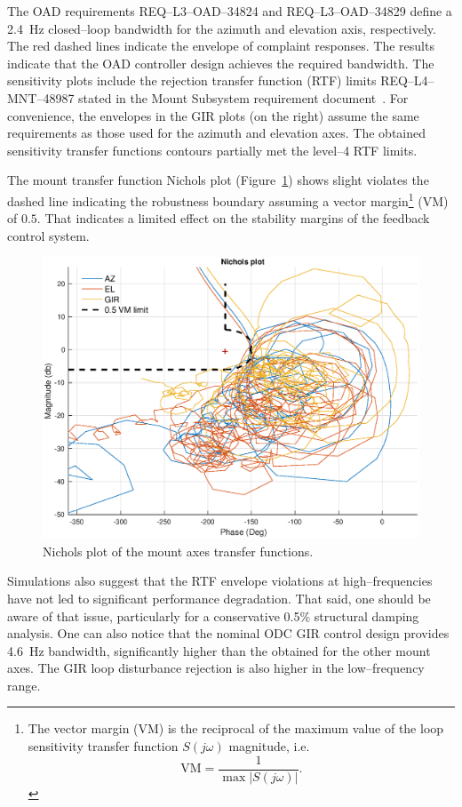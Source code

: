 %
The OAD requirements REQ--L3--OAD--34824 and REQ--L3--OAD--34829 define a \SI{2.4}{Hz} closed--loop bandwidth for the azimuth and elevation axis, respectively. The red dashed lines indicate the envelope of complaint responses. The results indicate that the OAD controller design achieves the required bandwidth. The sensitivity plots include the rejection transfer function (RTF) limits REQ--L4--MNT--48987 stated in the Mount Subsystem requirement document~\cite{MOUNT-RD}. For convenience, the envelopes in the GIR plots (on the right) assume the same requirements as those used for the azimuth and elevation axes. The obtained sensitivity transfer functions contours partially met the level--4 RTF limits. 

The mount transfer function Nichols plot (Figure~\ref{fig:mnt-nichols-plot}) shows slight violates the dashed line indicating the robustness boundary assuming a vector margin\footnote{The vector margin (VM) is the reciprocal of the maximum value of the loop sensitivity transfer function $S\left(j\omega\right)$ magnitude, i.e.$$\text{VM}=\frac{1}{\max \left|S(j\omega)\right|}.$$} (VM) of $0.5$. That indicates a limited effect on the stability margins of the feedback control system. 
\begin{figure}[!htb]
  \centering
  \includegraphics[width=\linewidth]{./ctrl_sec_images/all_mnt_axes_nichols.eps}
  \caption{Nichols plot of the mount axes transfer functions.}
  \label{fig:mnt-nichols-plot}
\end{figure}
Simulations also suggest that the RTF envelope violations at high--frequencies have not led to significant performance degradation. That said, one should be aware of that issue, particularly for a conservative 0.5\% structural damping analysis. One can also notice that the nominal ODC GIR control design provides \SI{4.6}{Hz} bandwidth, significantly higher than the obtained for the other mount axes. The GIR loop disturbance rejection is also higher in the low--frequency range.




